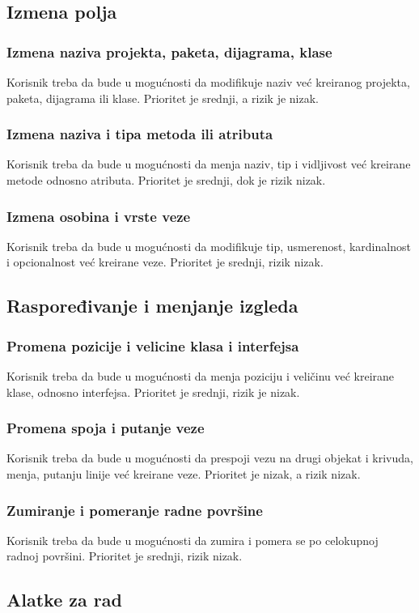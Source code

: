 \documentclass[a4paper]{article}
\begin{document}
\subsection{Izmena polja}
\subsubsection{Izmena naziva projekta, paketa, dijagrama, klase}
Korisnik treba da bude u mogućnosti da modifikuje naziv već kreiranog projekta, paketa, dijagrama ili klase. Prioritet je srednji, a rizik je nizak.  
\subsubsection{Izmena naziva i tipa metoda ili atributa}
Korisnik treba da bude u mogućnosti da menja naziv, tip i vidljivost već kreirane metode odnosno atributa. Prioritet je srednji, dok je rizik nizak.  
\subsubsection{Izmena osobina i vrste veze}
Korisnik treba da bude u mogućnosti da modifikuje tip, usmerenost, kardinalnost i opcionalnost već kreirane veze. Prioritet je srednji, rizik nizak.  
\subsection{Raspoređivanje i menjanje izgleda}
\subsubsection{Promena pozicije i velicine klasa i interfejsa}
Korisnik treba da bude u mogućnosti da menja poziciju i veličinu već kreirane klase, odnosno interfejsa. Prioritet je srednji, rizik je nizak.  
\subsubsection{Promena spoja i putanje veze}
Korisnik treba da bude u mogućnosti da prespoji vezu na drugi objekat i krivuda, menja, putanju linije već kreirane veze. Prioritet je nizak, a rizik nizak. 
\subsubsection{Zumiranje i pomeranje radne površine}
Korisnik treba da bude u mogućnosti da zumira i pomera se po celokupnoj radnoj površini. Prioritet je srednji, rizik nizak.
\subsection{Alatke za rad}
\end{document}
